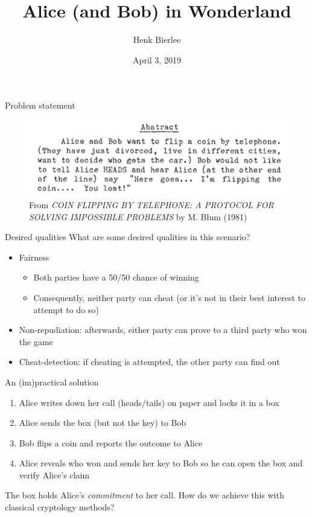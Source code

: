 \documentclass{beamer}
\title{Alice (and Bob) in Wonderland}
\author{Henk Bierlee}
\institute{Uppsala University}
\date{April 3, 2019}
\begin{document}
 
\frame{\titlepage}
 
\begin{frame}{Problem statement}

\begin{figure}
    \centering
    \includegraphics{blum-abstract}
    \caption{From \emph{COIN FLIPPING BY TELEPHONE: A PROTOCOL FOR SOLVING IMPOSSIBLE PROBLEMS} by M. Blum (1981)}
    \label{fig:blum-abstract}
\end{figure}

\end{frame}

\begin{frame}{Desired qualities}
    What are some desired qualities in this scenario?
    \begin{itemize}
        \item Fairness
        \begin{itemize}
            \item Both parties have a 50/50 chance of winning
            \item Consequently, neither party can cheat (or it's not in their best interest to attempt to do so)
        \end{itemize} 
        \item Non-repudiation: afterwards, either party can prove to a third party who won the game
        \item Cheat-detection: if cheating is attempted, the other party can find out
    \end{itemize}

\end{frame}

\begin{frame}{An (im)practical solution}
    \begin{enumerate}
        \item Alice writes down her call (heads/tails) on paper and locks it in a box
        \item Alice sends the box (but not the key) to Bob
        \item Bob flips a coin and reports the outcome to Alice
        \item Alice reveals who won and sends her key to Bob so he can open the box and verify Alice's claim
    \end{enumerate}
    The box holds Alice's \emph{commitment} to her call. How do we achieve this with classical cryptology methods?
\end{frame}
\end{document}

